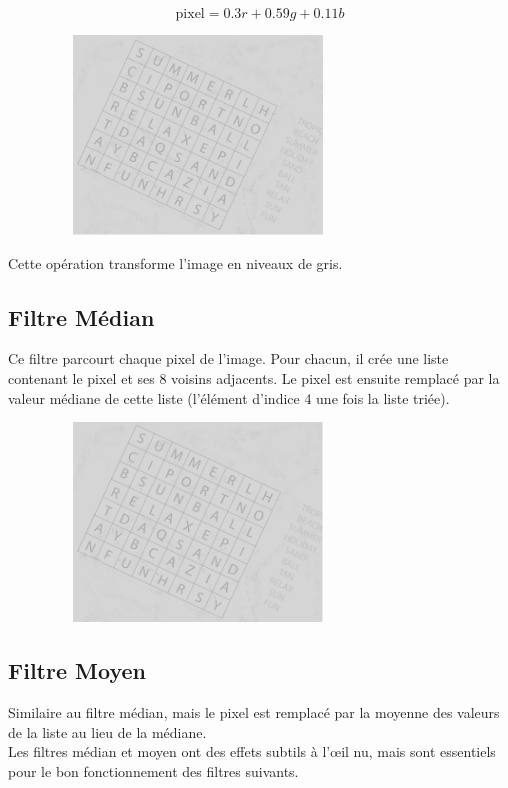 \[
\text{pixel} = 0.3r + 0.59g + 0.11b
\]

\begin{figure}[hbt]
	\centering
	\includegraphics[width=300px,height=200px]{obrazky-figures/2.png}
\end{figure}

Cette opération transforme l'image en niveaux de gris.

\subsection{Filtre Médian}

Ce filtre parcourt chaque pixel de l'image. Pour chacun, il crée une liste contenant le pixel et ses 8 voisins adjacents. Le pixel est ensuite remplacé par la valeur médiane de cette liste (l'élément d'indice 4 une fois la liste triée). \\

\begin{figure}[hbt]
	\centering
	\includegraphics[width=300px,height=200px]{obrazky-figures/3.png}
\end{figure}

\subsection{Filtre Moyen}

Similaire au filtre médian, mais le pixel est remplacé par la moyenne des valeurs de la liste au lieu de la médiane. \\
Les filtres médian et moyen ont des effets subtils à l'œil nu, mais sont essentiels pour le bon fonctionnement des filtres suivants. \\

